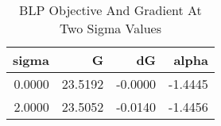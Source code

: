 \begin{table}[htbp]
    \centering
    \caption{BLP Objective And Gradient At Two Sigma Values}
    \label{tab:q4_blp_results_two_sigmas}
\toprule
\begin{tabular}{rrrr}
\toprule
sigma & G & dG & alpha \\
\midrule
\midrule
0.0000 & 23.5192 & -0.0000 & -1.4445 \\
2.0000 & 23.5052 & -0.0140 & -1.4456 \\
\bottomrule
\bottomrule
\end{tabular}

\end{table}
